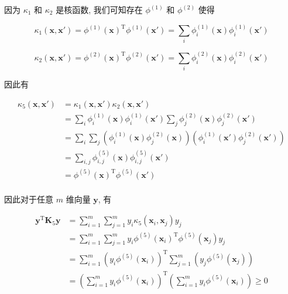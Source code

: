 \documentclass[answers]{exam}  %
\begin{document}
\begin{questions}
\begin{solution}
\begin{enumerate}
            因为 $\kappa_1$ 和 $\kappa_2$ 是核函数, 我们可知存在 $\phi^{(1)}$ 和 $\phi^{(2)}$ 使得

            $$
              \kappa_1(\bm{x}, \bm{x}') = \phi^{(1)}(\bm{x})^{\mathrm{T}}\phi^{(1)}(\bm{x}') = \sum_{i}\phi_i^{(1)}(\bm{x})\phi_i^{(1)}(\bm{x}')
            $$

            $$
              \kappa_2(\bm{x}, \bm{x}') = \phi^{(2)}(\bm{x})^{\mathrm{T}}\phi^{(2)}(\bm{x}') = \sum_{i}\phi_i^{(2)}(\bm{x})\phi_i^{(2)}(\bm{x}')
            $$

            因此有

            $$
              \begin{aligned}
                \kappa_5(\bm{x}, \bm{x}')
                 & = \kappa_1(\bm{x}, \bm{x}')\kappa_2(\bm{x}, \bm{x}')                                                     \\
                 & = \sum_{i}\phi_i^{(1)}(\bm{x})\phi_i^{(1)}(\bm{x}')\sum_{j}\phi_j^{(2)}(\bm{x})\phi_j^{(2)}(\bm{x}')     \\
                 & = \sum_{i}\sum_{j}(\phi_i^{(1)}(\bm{x})\phi_j^{(2)}(\bm{x}))(\phi_i^{(1)}(\bm{x}')\phi_j^{(2)}(\bm{x}')) \\
                 & = \sum_{i, j}\phi_{i,j}^{(5)}(\bm{x})\phi_{i,j}^{(5)}(\bm{x}')                                           \\
                 & = \phi^{(5)}(\bm{x})^{\mathrm{T}}\phi^{(5)}(\bm{x}')                                                     \\
              \end{aligned}
            $$

            因此对于任意 $m$ 维向量 $\bm{y}$, 有

            $$
              \begin{aligned}
                \bm{y}^{\mathrm{T}} \bm{K}_5 \bm{y}
                 & = \sum_{i=1}^{m}\sum_{j=1}^{m}y_i \kappa_5(\bm{x}_i, \bm{x}_j) y_j                                       \\
                 & = \sum_{i=1}^{m}\sum_{j=1}^{m}y_i \phi^{(5)}(\bm{x}_i)^{\mathrm{T}}\phi^{(5)}(\bm{x}_j) y_j              \\
                 & = \sum_{i=1}^{m} (y_i \phi^{(5)}(\bm{x}_i))^{\mathrm{T}}\sum_{j=1}^{m}(y_j \phi^{(5)}(\bm{x}_j))         \\
                 & = (\sum_{i=1}^{m} y_i \phi^{(5)}(\bm{x}_i))^{\mathrm{T}} (\sum_{i=1}^{m} y_i \phi^{(5)}(\bm{x}_i)) \ge 0 \\
              \end{aligned}
            $$


\end{enumerate}
\end{solution}
\end{questions}
\end{document}
